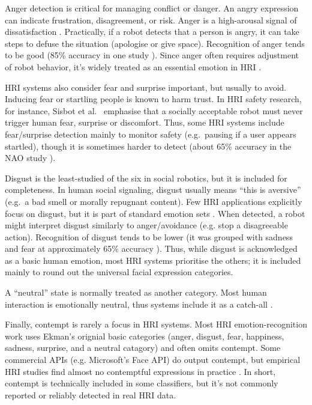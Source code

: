 Anger detection is critical for managing conflict or danger. An angry expression can indicate frustration, disagreement, or risk. Anger is a high-arousal signal of dissatisfaction \cite{Stock-Homburg2022-wd}. Practically, if a robot detects that a person is angry, it can take steps to defuse the situation (apologise or give space). Recognition of anger tends to be good (85\% accuracy in one study \cite{Ramis2020-ec}). Since anger often requires adjustment of robot behavior, it's widely treated as an essential emotion in HRI \cite{Stock-Homburg2022-wd}.

HRI systems also consider fear and surprise important, but usually to avoid. Inducing fear or startling people is known to harm trust. In HRI safety research, for instance, Sisbot et al.\ \cite{Sisbot2010-wy} emphasise that a socially acceptable robot must never trigger human fear, surprise or discomfort. Thus, some HRI systems include fear/surprise detection mainly to monitor safety (e.g.\ pausing if a user appears startled), though it is sometimes harder to detect (about 65\% accuracy in the NAO study \cite{Filippini2021-ni}).

Disgust is the least-studied of the six in social robotics, but it is included for completeness. In human social signaling, disgust usually means ``this is aversive'' (e.g.\ a bad smell or morally repugnant content). Few HRI applications explicitly focus on disgust, but it is part of standard emotion sets \cite{Stock-Homburg2022-wd}. When detected, a robot might interpret disgust similarly to anger/avoidance (e.g. stop a disagreeable action). Recognition of disgust tends to be lower (it was grouped with sadness and fear at approximately 65\% accuracy \cite{Filippini2021-ni}). Thus, while disgust is acknowledged as a basic human emotion, most HRI systems prioritise the others; it is included mainly to round out the universal facial expression categories.

A ``neutral'' state is normally treated as another category. Most human interaction is emotionally neutral, thus systems include it as a catch-all \cite{Alonso-Martin2013-cv}.

Finally, contempt is rarely a focus in HRI systems. Most HRI emotion-recognition work uses Ekman's orignial basic categories (anger, disgust, fear, happiness, sadness, surprise, and a neutral catagory) and often omits contempt. Some commercial APIs (e.g. Microsoft's Face API) do output contempt, but empirical HRI studies find almost no contemptful expressions in practice \cite{Chuah2021-zw}. In short, contempt is technically included in some classifiers, but it's not commonly reported or reliably detected in real HRI data.

